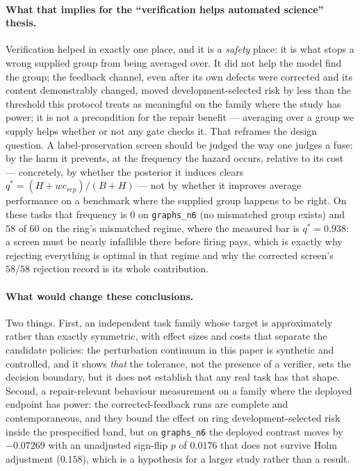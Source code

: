 \documentclass{neurips_2024}
\begin{document}
\paragraph{What that implies for the ``verification helps automated science'' thesis.}
Verification helped in exactly one place, and it is a \emph{safety} place: it is what stops a
wrong supplied group from being averaged over. It did not help the model find the group; the
feedback channel, even after its own defects were corrected and its content demonstrably changed,
moved development-selected risk by less than the threshold this protocol treats as meaningful on
the family where the study has power; it is not a precondition for the repair benefit --- averaging
over a group we supply helps whether or not any gate checks it. That reframes the design question.
A label-preservation screen should be judged the way one judges a fuse: by the harm it prevents, at
the frequency the hazard occurs, relative to its cost --- concretely, by whether the posterior it
induces clears $q^* = (H + w c_{rep})/(B+H)$ --- not by whether it improves average performance on a
benchmark where the supplied group happens to be right. On these tasks that frequency is
$0$ on \texttt{graphs\_n6} (no mismatched group exists) and $58$ of $60$ on the ring's mismatched
regime, where the measured bar is $q^* = 0.938$: a screen must be nearly infallible there before
firing pays, which is exactly why rejecting everything is optimal in that regime and why the
corrected screen's $58/58$ rejection record is its whole contribution.

\paragraph{What would change these conclusions.}
Two things. First, an independent task family whose target is approximately rather than exactly
symmetric, with effect sizes and costs that separate the candidate policies: the perturbation
continuum in this paper is synthetic and controlled, and it shows \emph{that} the tolerance, not
the presence of a verifier, sets the decision boundary, but it does not establish that any
real task has that shape. Second, a repair-relevant behaviour measurement on a family where the
deployed endpoint has power: the corrected-feedback runs are complete and contemporaneous, and
they bound the effect on ring development-selected risk inside the prespecified band, but on
\texttt{graphs\_n6} the deployed contrast moves by $-0.07269$ with an unadjusted sign-flip
$p$ of $0.0176$ that does not survive Holm adjustment ($0.158$), which is a hypothesis for a
larger study rather than a result.
\end{document}
